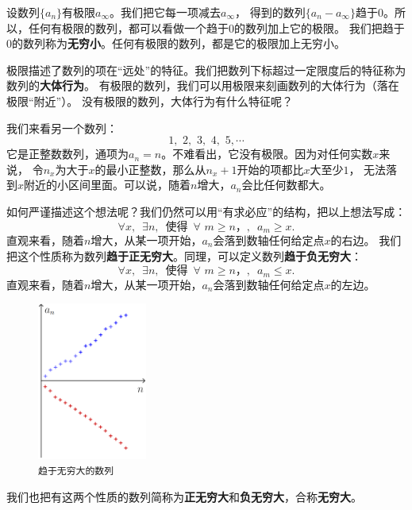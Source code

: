 \documentclass[12pt,UTF8]{ctexbook}
\begin{document}
设数列$\{a_n\}$有极限$a_\infty$。我们把它每一项减去$a_\infty$，
得到的数列$\{a_n - a_\infty\}$趋于$0$。所以，任何有极限的数列，都可以看做一个趋于$0$的数列加上它的极限。
我们把趋于$0$的数列称为\textbf{无穷小}。任何有极限的数列，都是它的极限加上无穷小。

极限描述了数列的项在“远处”的特征。我们把数列下标超过一定限度后的特征称为数列的\textbf{大体行为}。
有极限的数列，我们可以用极限来刻画数列的大体行为（落在极限“附近”）。
没有极限的数列，大体行为有什么特征呢？

我们来看另一个数列：
$$ 1,\,\,2,\,\,3,\,\,4,\,\,5,\cdots $$
它是正整数数列，通项为$a_n = n$。不难看出，它没有极限。因为对任何实数$x$来说，
令$n_x$为大于$x$的最小正整数，那么从$n_x+1$开始的项都比$x$大至少$1$，
无法落到$x$附近的小区间里面。可以说，随着$n$增大，$a_n$会比任何数都大。

如何严谨描述这个想法呢？我们仍然可以用“有求必应”的结构，把以上想法写成：
$$ \forall x, \,\,\, \exists n, \,\,\,\mbox{使得} \,\,\,\forall \,\, m \geqslant n，,\,\,\, a_m \geqslant x.$$
直观来看，随着$n$增大，从某一项开始，$a_n$会落到数轴任何给定点$x$的右边。
我们把这个性质称为数列\textbf{趋于正无穷大}。同理，可以定义数列\textbf{趋于负无穷大}：
$$\forall x, \,\,\, \exists n, \,\,\,\mbox{使得}\,\,\,\forall \,\, m \geqslant n，,\,\,\, a_m \leqslant x.$$
直观来看，随着$n$增大，从某一项开始，$a_n$会落到数轴任何给定点$x$的左边。

\begin{figure} %
    \vspace{-48pt}
    \flushright
    \includegraphics[width=0.32\textwidth]{tu/数列无穷大1.png}
    \caption*{\texttt{趋于无穷大的数列}}
\end{figure}

我们也把有这两个性质的数列简称为\textbf{正无穷大}和\textbf{负无穷大}，合称\textbf{无穷大}。
\end{document}
